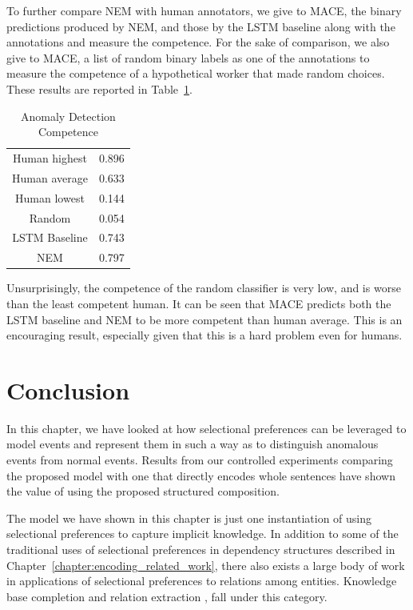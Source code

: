 To further compare NEM with human annotators, we give to MACE, the binary predictions produced
by NEM, and those by the LSTM baseline along with the annotations and
measure the competence.  For the sake of comparison, we also give to MACE, a list of
random binary labels as one of the annotations 
to measure the competence of a hypothetical worker that made random choices. 
These results are reported in Table~\ref{table:nem_mace_competence}.
\begin{table}
\begin{center}
  \begin{tabular}[c]{cc}
 \toprule
 Human highest  & 0.896 \\
  Human average & 0.633 \\
  Human lowest & 0.144 \\
  \midrule
  Random & 0.054 \\
  \midrule
  LSTM Baseline & 0.743 \\
  NEM &  0.797 \\
  \bottomrule
  \end{tabular}
\end{center}
 \caption{Anomaly Detection Competence}\label{table:nem_mace_competence}
\end{table}
Unsurprisingly, the competence of the random classifier is very low, and is worse than the least competent human.
It can be seen that MACE predicts both the LSTM baseline and NEM to be more competent than human average. This is an encouraging
result, especially given that this is a hard problem even for humans.

\section{Conclusion}
In this chapter, we have looked at how selectional preferences can be leveraged to model events and represent
them in such a way as to distinguish anomalous events from normal events. Results from our controlled experiments
comparing the proposed model with one that directly encodes whole sentences have shown the value of using the proposed structured
composition.

The model we have shown in this chapter is just one instantiation of using selectional preferences to capture implicit knowledge.
In addition to some of the traditional uses of selectional preferences in dependency structures described in Chapter~\ref{chapter:encoding_related_work},
there also exists a large body of work in applications of selectional preferences to relations among entities. Knowledge base completion and 
relation extraction
\citep[among others]{mintz2009distant,sutskever2009modelling,nickel2011three,bordes2011learning,socher2013reasoning,gardner2014incorporating},
fall under this category.

